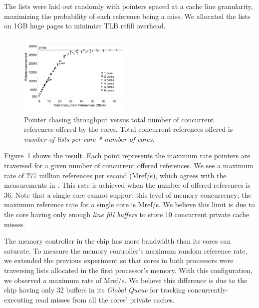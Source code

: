 \documentclass[10pt,nocopyrightspace,preprint]{sigplanconf}
\newcommand{\mrps}[1]{\unit[#1]{Mref/s}}
\begin{document}
The lists were laid out randomly with pointers spaced at a cache line granularity, maximizing
the probability of each reference being a miss. We allocated the lists
on 1GB huge pages to minimize TLB refill overhead.

\begin{figure}[t]
  \vspace{-.1in}
	\begin{center}
		\includegraphics[width=0.47\textwidth]{figures/multi-listwalk-totalconc-edited.pdf}
	\end{center}
	\caption{Pointer chasing throughput versus total number of
          concurrent references offered by the cores. Total concurrent references offered is \emph{number of lists per core * number of cores}.
        }
	\label{fig:listwalk-totalconc}
\end{figure}

Figure~\ref{fig:listwalk-totalconc} shows the result. Each point represents
the maximum rate pointers are traversed for a given number of
concurrent offered references. We see a maximum rate of 277 million references per second (\mrps{}), which agrees with the measurements in \cite{Mandal:2010}. This rate is achieved when the number of offered references is 36. Note that a single core cannot support this level of
memory concurrency; the maximum reference rate for a single core is
\mrps{107}. We believe this limit is due to the core having only enough {\em line fill
  buffers} \cite{nehalem:arch} to store 10 concurrent private cache misses.

The memory controller in the chip has more bandwidth than its
cores can saturate. To measure the memory controller's maximum random
reference rate, we extended the previous experiment so that cores in
both processors were traversing lists allocated in the first processor's
memory. With this configuration, we observed a maximum rate of \mrps{360}. We believe this difference is due to the chip having only 32 buffers in its {\em Global Queue} \cite{nehalem:perf} for tracking concurrently-executing read misses from all the cores' private caches.
\end{document}
